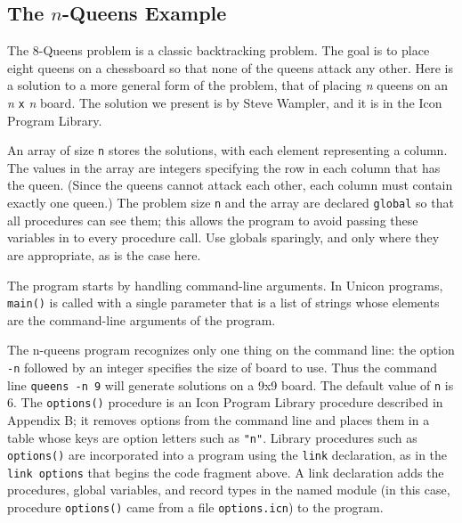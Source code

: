 \subsection*{The $n$-Queens Example}

The 8-Queens problem is a classic
backtracking problem. The goal is to place eight
queens on a chessboard so that none of the queens attack any other.
Here is a solution to a more general form of the problem, that of
placing \textit{n} queens on an \textit{n} \texttt{x}
\textit{n} board. The solution we present is by Steve Wampler, and it is in the Icon Program Library.

An array of size \texttt{n} stores the solutions, with each element
representing a column. The values in the array are integers specifying
the row in each column that has the queen. (Since the queens cannot
attack each other, each column must contain exactly one queen.) The
problem size \texttt{n} and the array are declared \texttt{global} so
that all procedures can see them; this allows the program to avoid
passing these variables in to every procedure call. Use globals
sparingly, and only where they are appropriate, as is the case here.


The program starts by handling command-line arguments. In Unicon
programs, \texttt{main()} is called with a single parameter that is a
list of strings whose elements are the command-line arguments of the
program.

The n-queens program recognizes only one thing on the command line: the
option \texttt{{}-n} followed by an integer specifies the size of board
to use. Thus the command line \texttt{queens -n 9} will generate
solutions on a 9x9 board. The default value of \texttt{n} is 6. The
\texttt{options()} procedure is an Icon Program
Library procedure described in Appendix B; it removes options from the
command line and places them in a table whose keys are option letters
such as \texttt{"n"}. Library procedures
such as \texttt{options()} are incorporated into a program using the
\texttt{link} declaration, as in the \texttt{link options}
that begins the code fragment above. A link declaration adds the
procedures, global variables, and record types in the named module (in
this case, procedure \texttt{options()} came from a file
\texttt{options.icn}) to the program.

